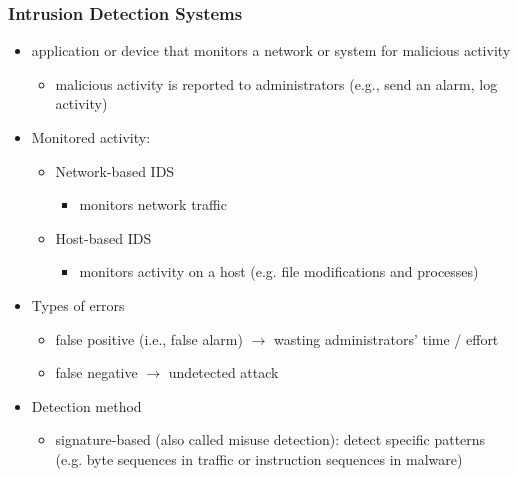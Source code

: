 \documentclass[final]{article}
\begin{document}
\subsubsection*{Intrusion Detection Systems}
\begin{itemize}[nosep]
    \item application or device that monitors a network or system for malicious activity
          \begin{itemize}[nosep]
              \item malicious activity is reported to administrators (e.g., send an alarm, log activity)
          \end{itemize}
    \item Monitored activity:
          \begin{multicols}{2}
              \begin{itemize}[nosep]
                  \item Network-based IDS
                        \begin{itemize}
                            \item monitors network traffic
                        \end{itemize}\vfill\null
                  \item Host-based IDS
                        \begin{itemize}[nosep]
                            \item monitors activity on a host (e.g. file modifications and processes)
                        \end{itemize}
              \end{itemize}
          \end{multicols}
    \item Types of errors
          \begin{itemize}[nosep]
              \item false positive (i.e., false alarm) $\rightarrow$ wasting administrators’ time / effort
              \item false negative $\rightarrow$ undetected attack
          \end{itemize}
    \item Detection method
          \begin{itemize}
              \item signature-based (also called misuse detection): detect specific patterns (e.g. byte sequences in traffic or instruction sequences in malware)
                    \begin{itemize}[nosep]

\end{itemize}
\end{itemize}
\end{itemize}
\end{document}
